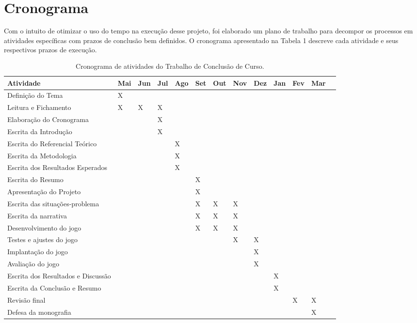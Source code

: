 \chapter{Cronograma}
\label{cronograma}

Com o intuito de otimizar o uso do tempo na execução desse projeto, foi elaborado um plano de trabalho para decompor os processos em atividades específicas com prazos de conclusão bem definidos. O cronograma apresentado na Tabela 1 descreve cada atividade e seus respectivos prazos de execução. 

\begin{table}[!htb]
	\centering %
	\caption{Cronograma de atividades do Trabalho de Conclusão de Curso.}
	\label{extabela}
	\renewcommand{\arraystretch}{1.5}
	\begin{tabularx}{\textwidth}{l*{12}{X}}
		\hline
		Atividade & Mai & Jun & Jul & Ago & Set & Out & Nov & Dez & Jan & Fev & Mar \\
		\hline 
		Definição do Tema & X & &  &  &  &  &  &  &  &  & \\
		\hline 
		Leitura e Fichamento & X & X & X &  &  &  &  &  &  & & \\
		\hline
		Elaboração do Cronograma &  &  & X &  &  &  &  &  &  &  &\\
		\hline 
		Escrita da Introdução &  &  & X &  &  &  &  &  &  & &\\
		\hline
		Escrita do Referencial Teórico &  &  &  & X &  &  &  &  &  & &\\
		\hline
		Escrita da Metodologia &  &  &  & X &  &  &  &  &  & &\\
		\hline
		Escrita dos Resultados Esperados &  &  &  & X &  &  &  &  &  & &\\
		\hline
		Escrita do Resumo &  &  &  &  & X &  &  &  &  & &\\
		\hline
		Apresentação do Projeto &  &  &  &  & X &  &  &  &  & &\\
		\hline
		Escrita das situações-problema &  &  &  &  & X & X & X &  &  & &\\
		\hline
		Escrita da narrativa &  &  &  &  & X & X & X &  &  & &\\
		\hline
		Desenvolvimento do jogo &  &  &  &  & X & X & X &  &  & &\\
		\hline
		Testes e ajustes do jogo &  &  &  &  &  &  & X & X &  & &\\
		\hline
		Implantação do jogo &  &  &  &  &  &  &  & X &  & &\\
		\hline
		Avaliação do jogo &  &  &  &  &  &  &  & X &  & &\\
		\hline
		Escrita dos Resultados e Discussão &  &  &  &  &  &  &  &  & X & &\\
		\hline
		Escrita da Conclusão e Resumo &  &  &  &  &  &  &  &  & X & &\\
		\hline
		Revisão final &  &  &  &  &  &  &  &  & & X & X\\
		\hline
		Defesa da monografia &  &  &  &  &  &  &  &  &  &  & X\\
		\hline
	\end{tabularx}
\end{table}
